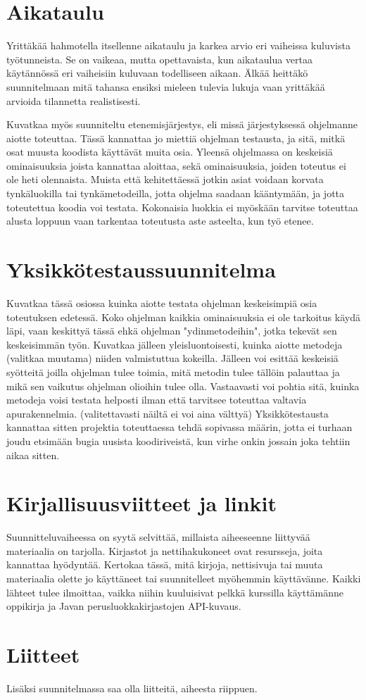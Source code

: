 \documentclass[a4paper,11pt]{article}
\begin{document}
\section{Aikataulu}

      Yrittäkää hahmotella itsellenne aikataulu ja karkea arvio eri vaiheissa kuluvista työtunneista. Se on vaikeaa, mutta opettavaista, kun aikataulua vertaa käytännössä eri vaiheisiin kuluvaan todelliseen aikaan. Älkää heittäkö suunnitelmaan mitä tahansa ensiksi mieleen tulevia lukuja vaan yrittäkää arvioida tilannetta realistisesti.

      Kuvatkaa myös suunniteltu etenemisjärjestys, eli missä järjestyksessä ohjelmanne aiotte toteuttaa. Tässä kannattaa jo miettiä ohjelman testausta, ja sitä, mitkä osat muusta koodista käyttävät muita osia. Yleensä ohjelmassa on keskeisiä ominaisuuksia joista kannattaa aloittaa, sekä ominaisuuksia, joiden toteutus ei ole heti olennaista. Muista että kehitettäessä jotkin asiat voidaan korvata tynkäluokilla tai tynkämetodeilla, jotta ohjelma saadaan kääntymään, ja jotta toteutettua koodia voi testata. Kokonaisia luokkia ei myöskään tarvitse toteuttaa alusta loppuun vaan tarkentaa toteutusta aste asteelta, kun työ etenee.
\section{Yksikkötestaussuunnitelma}

      Kuvatkaa tässä osiossa kuinka aiotte testata ohjelman keskeisimpiä osia toteutuksen edetessä. Koko ohjelman kaikkia ominaisuuksia ei ole tarkoitus käydä läpi, vaan keskittyä tässä ehkä ohjelman "ydinmetodeihin", jotka tekevät sen keskeisimmän työn. Kuvatkaa jälleen yleisluontoisesti, kuinka aiotte metodeja (valitkaa muutama) niiden valmistuttua kokeilla. Jälleen voi esittää keskeisiä syötteitä joilla ohjelman tulee toimia, mitä metodin tulee tällöin palauttaa ja mikä sen vaikutus ohjelman olioihin tulee olla. Vastaavasti voi pohtia sitä, kuinka metodeja voisi testata helposti ilman että tarvitsee toteuttaa valtavia apurakennelmia. (valitettavasti näiltä ei voi aina välttyä) Yksikkötestausta kannattaa sitten projektia toteuttaessa tehdä sopivassa määrin, jotta ei turhaan joudu etsimään bugia uusista koodiriveistä, kun virhe onkin jossain joka tehtiin aikaa sitten.
\section{Kirjallisuusviitteet ja linkit}

      Suunnitteluvaiheessa on syytä selvittää, millaista aiheeseenne liittyvää materiaalia on tarjolla. Kirjastot ja nettihakukoneet ovat resursseja, joita kannattaa hyödyntää. Kertokaa tässä, mitä kirjoja, nettisivuja tai muuta materiaalia olette jo käyttäneet tai suunnitelleet myöhemmin käyttävänne. Kaikki lähteet tulee ilmoittaa, vaikka niihin kuuluisivat pelkkä kurssilla käyttämänne oppikirja ja Javan perusluokkakirjastojen API-kuvaus.
\section{Liitteet}

      Lisäksi suunnitelmassa saa olla liitteitä, aiheesta riippuen.
\end{document}
